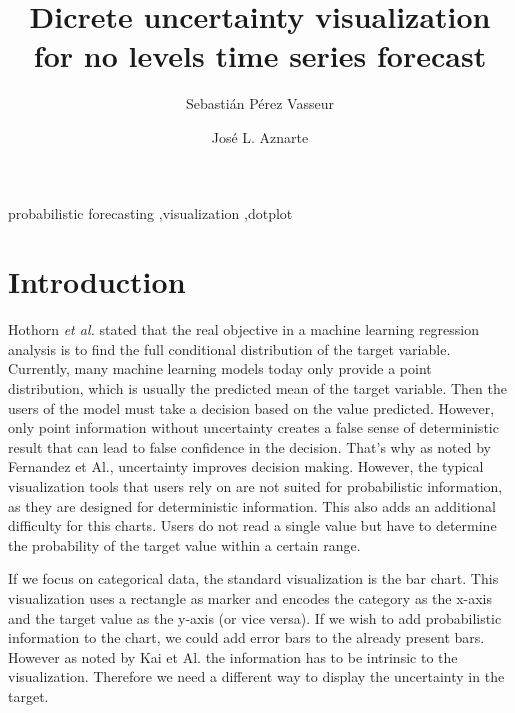 \documentclass[a4paper,3p,sort&compress]{elsarticle}
\begin{document}
\linenumbers

\newcommand{\no}{NO\textsubscript{2}\xspace}

\begin{frontmatter}

  \title{Dicrete uncertainty visualization for no levels time series forecast}


  \author{Sebasti\'an P\'erez Vasseur}
  \author{Jos\'e L. Aznarte}
  \address{Artificial Intelligence Department\\Universidad Nacional de
    Educaci\'on a Distancia --- UNED\\c/ Juan del Rosal, 16, Madrid, Spain}
  

\begin{abstract}
  
\end{abstract}

\begin{keyword}
probabilistic forecasting \sep visualization \sep dotplot
\end{keyword}

\end{frontmatter}


\section{Introduction}
\label{sec:intro}

Hothorn \emph{et al.} stated that the real
objective in a machine learning regression analysis is to find the full conditional distribution
of the target variable. Currently, many machine learning models today only provide a point distribution, 
which is usually the predicted
mean of the target variable. Then the users of the model must take a decision based on the value predicted. 
However, only point information without uncertainty creates a false sense of deterministic result that can lead 
to false confidence in the decision. That's why as noted by Fernandez et Al., uncertainty improves decision making. 
However, the typical visualization tools that users rely on are not suited for probabilistic information, 
as they are designed for deterministic information. This also adds an additional difficulty for this charts. Users do not read
a single value but have to determine the probability of the target value within a certain range.

If we focus on categorical data, the standard visualization is the bar chart. This visualization uses a rectangle as marker and 
encodes the category as the x-axis and the target value as the y-axis (or vice versa). If we wish to add probabilistic information 
to the chart, we could add error bars to the already present bars. However as noted by Kai et Al. 
the information has to be intrinsic to the visualization. Therefore we need a different way to display the uncertainty in the target.
\end{document}
